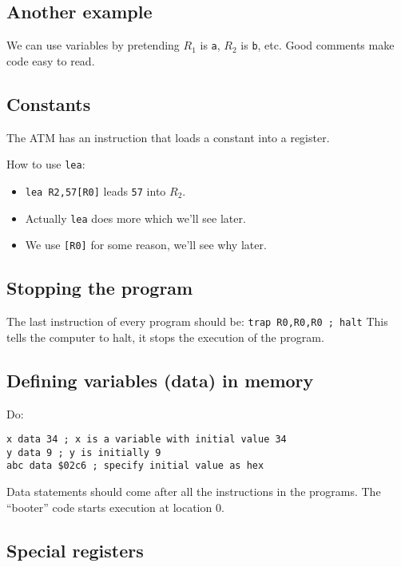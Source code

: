 \subsection{Another example}\label{sub:another_example}

We can use variables by pretending \(R_1\) is  \texttt{a}, \(R_2\) is \texttt{b}, etc.
Good comments make code easy to read.

\subsection{Constants}\label{sub:constants}

The ATM has an instruction that loads a constant into a register.

How to use \texttt{lea}:
\begin{itemize}
	\item \texttt{lea R2,57[R0]} leads \texttt{57} into \(R_2\).
	\item Actually \texttt{lea} does more which we'll see later.
	\item We use \texttt{[R0]} for some reason, we'll see why later.
\end{itemize}

\subsection{Stopping the program}\label{sub:stopping_the_program}

The last instruction of every program should be: \texttt{trap R0,R0,R0 ; halt}
This tells the computer to halt, it stops the execution of the program.

\subsection{Defining variables (data) in memory}\label{sub:defining_variables_data_in_memory}

Do:
\begin{verbatim}
x data 34 ; x is a variable with initial value 34
y data 9 ; y is initially 9
abc data $02c6 ; specify initial value as hex
\end{verbatim}
Data statements should come after all the instructions in the programs.
The ``booter'' code starts execution at location \(0\).

\subsection{Special registers}\label{sub:special_registers}

